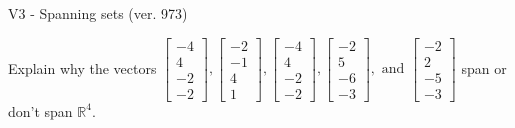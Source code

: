 \begin{exercise}
  \begin{exerciseTitle}V3 - Spanning sets (ver. 973)\end{exerciseTitle}
  \begin{exerciseStatement}
    Explain why the vectors \(\left[\begin{array}{r}
-4 \\
4 \\
-2 \\
-2
\end{array}\right] , \left[\begin{array}{r}
-2 \\
-1 \\
4 \\
1
\end{array}\right] , \left[\begin{array}{r}
-4 \\
4 \\
-2 \\
-2
\end{array}\right] , \left[\begin{array}{r}
-2 \\
5 \\
-6 \\
-3
\end{array}\right] , \text{ and } \left[\begin{array}{r}
-2 \\
2 \\
-5 \\
-3
\end{array}\right]\) span or don't span \(\mathbb{R}^4\). 
	



\end{exerciseStatement}
\end{exercise}
